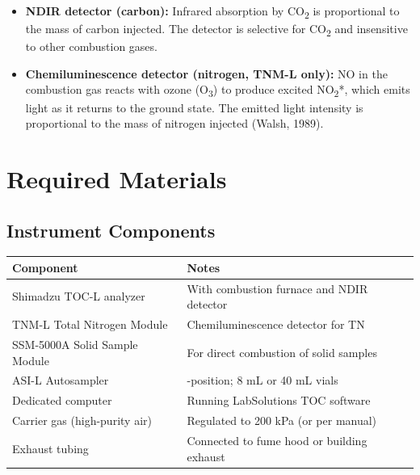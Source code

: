 \documentclass[
  11pt,
  letterpaper,
]{article}
\newcounter{none} %
\providecommand{\tightlist}{%
  \setlength{\itemsep}{0pt}\setlength{\parskip}{0pt}}
\begin{document}
\begin{itemize}
\tightlist
\item
  \textbf{NDIR detector (carbon):} Infrared absorption by
  CO\textsubscript{2} is proportional to the mass of carbon injected.
  The detector is selective for CO\textsubscript{2} and insensitive to
  other combustion gases.
\item
  \textbf{Chemiluminescence detector (nitrogen, TNM-L only):} NO in the
  combustion gas reacts with ozone (O\textsubscript{3}) to produce
  excited NO\textsubscript{2}*, which emits light as it returns to the
  ground state. The emitted light intensity is proportional to the mass
  of nitrogen injected (Walsh, 1989).
\end{itemize}

\section{Required Materials}\label{required-materials}

\subsection{Instrument Components}\label{instrument-components}

{\def\LTcaptype{none} %
\begin{longtable}[]{@{}
  >{\raggedright\arraybackslash}p{}
  >{\raggedright\arraybackslash}p{}@{}}
\toprule\noalign{}
\begin{minipage}[b]{\linewidth}\raggedright
Component
\end{minipage} & \begin{minipage}[b]{\linewidth}\raggedright
Notes
\end{minipage} \\
\midrule\noalign{}
\endhead
\bottomrule\noalign{}
\endlastfoot
Shimadzu TOC-L analyzer & With combustion furnace and NDIR detector \\
TNM-L Total Nitrogen Module & Chemiluminescence detector for TN \\
SSM-5000A Solid Sample Module & For direct combustion of solid
samples \\
ASI-L Autosampler & 93-position; 8 mL or 40 mL vials \\
Dedicated computer & Running LabSolutions TOC software \\
Carrier gas (high-purity air) & Regulated to 200 kPa (or per manual) \\
Exhaust tubing & Connected to fume hood or building exhaust \\
\end{longtable}
}
\end{document}
